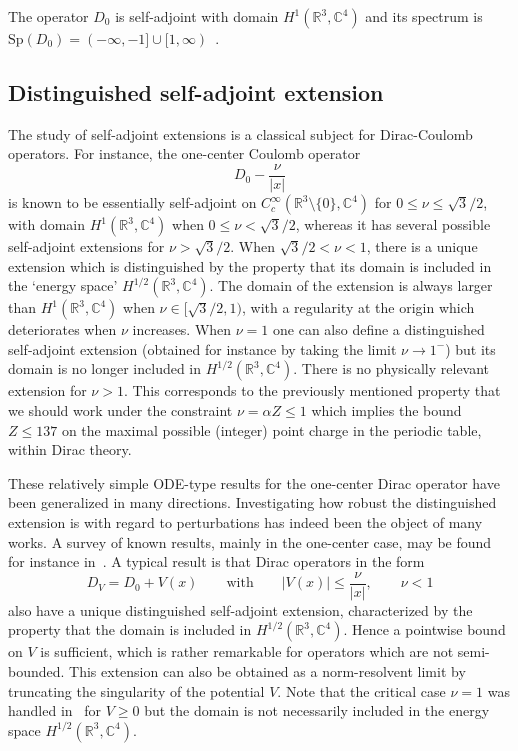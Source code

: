 \documentclass[10pt]{amsart}
\theoremstyle{definition}
\newcommand{\R}{\mathbb{R}}
\newcommand{\C}{\mathbb{C}}
\newcommand{\Spec}{\mathrm{Sp}}
\newcommand\1{{\ensuremath {\mathds 1} }}
\newcommand{\ii}{\infty}
\renewcommand{\geq}{\geqslant}
\renewcommand{\leq}{\leqslant}
\begin{document}
The operator $D_0$ is self-adjoint with domain $H^1(\R^3,\C^4)$ and its spectrum is $\Spec(D_0)=(-\ii,-1]\cup[1,\ii)$~\cite{Thaller}.

\subsection{Distinguished self-adjoint extension} The study of self-adjoint extensions is a classical subject for Dirac-Coulomb operators. For instance, the one-center Coulomb operator
\[
D_0-\frac{\nu}{|x|}
\]
is known to be essentially self-adjoint on $C^\ii_c(\R^3\setminus\{0\},\C^4)$ for $0\leq \nu\leq\sqrt3/2$, with domain $H^1(\R^3,\C^4)$ when $0\leq\nu<\sqrt{3}/2$, whereas it has several possible self-adjoint extensions for $\nu>\sqrt3/2$. When $\sqrt3/2<\nu<1$, there is a unique extension which is distinguished by the property that its domain is included in the `energy space' $H^{1/2}(\R^3,\C^4)$. The domain of the extension is always larger than $H^1(\R^3,\C^4)$ when $\nu\in[\sqrt3/2,1)$, with a regularity at the origin which deteriorates when $\nu$ increases. When $\nu=1$ one can also define a distinguished self-adjoint extension (obtained for instance by taking the limit $\nu\to1^-$) but its domain is no longer included in $H^{1/2}(\R^3,\C^4)$. There is no physically relevant extension for $\nu>1$. This corresponds to the previously mentioned property that we should work under the constraint $\nu=\alpha Z\le1$ which implies the bound $Z\leq 137$ on the maximal possible (integer) point charge in the periodic table, within Dirac theory.

These relatively simple ODE-type results for the one-center Dirac operator have been generalized in many directions. Investigating how robust the distinguished extension is with regard to perturbations has indeed been the object of many works. A survey of known results, mainly in the one-center case, may be found for instance in~\cite[Section~1.3]{EstLewSer-19}. A typical result is that Dirac operators in the form
\begin{equation}\label{eq:pointwise_one-center}
D_V=D_0+V(x)\qquad\text{with}\qquad |V(x)|\leq \frac{\nu}{|x|},\qquad \nu<1
\end{equation}
also have a unique distinguished self-adjoint extension, characterized by the property that the domain is included in $H^{1/2}(\R^3,\C^4)$. Hence a pointwise bound on $V$ is sufficient, which is rather remarkable for operators which are not semi-bounded. This extension can also be obtained as a norm-resolvent limit by truncating the singularity of the potential $V$. Note that the critical case $\nu=1$ was handled in~\cite{EstLos-07} for $V\geq0$ but the domain is not necessarily included in the energy space $H^{1/2}(\R^3,\C^4)$.
\end{document}
